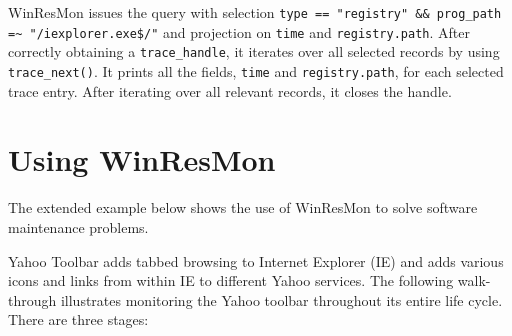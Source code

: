 \begin{itemize}
\noindent

WinResMon issues the query with selection {\small\tt type == "registry" \&\&
prog\_path =\~{} "/iexplorer.exe\$/"} and projection on {\small\tt time} and
{\small\tt registry.path}.  After correctly obtaining a {\small\tt trace\_handle}, it
iterates over all selected records by using {\small\tt trace\_next()}.  It prints
all the fields, {\small\tt time} and {\small\tt registry.path}, for each selected trace
entry.  After iterating over all relevant records, it closes the handle.

\end{itemize}


\section{Using WinResMon}

The extended example below shows the use of WinResMon to solve software
maintenance problems.

Yahoo Toolbar \cite{yahoo} adds tabbed browsing to Internet Explorer (IE) and
adds various icons and links from within IE to different Yahoo services.  The
following walk-through illustrates monitoring the Yahoo toolbar throughout its
entire life cycle.  There are three stages:

